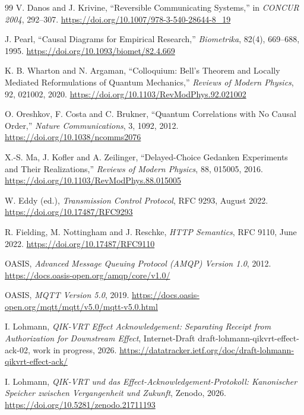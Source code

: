 \documentclass[11pt,a4paper]{article}
\theoremstyle{remark}
\begin{document}
\begin{thebibliography}{99}
V. Danos and J. Krivine,
``Reversible Communicating Systems,'' in \emph{CONCUR 2004}, 292--307.
\url{https://doi.org/10.1007/978-3-540-28644-8_19}

J. Pearl,
``Causal Diagrams for Empirical Research,''
\emph{Biometrika}, 82(4), 669--688, 1995.
\url{https://doi.org/10.1093/biomet/82.4.669}

K. B. Wharton and N. Argaman,
``Colloquium: Bell's Theorem and Locally Mediated Reformulations of Quantum
Mechanics,'' \emph{Reviews of Modern Physics}, 92, 021002, 2020.
\url{https://doi.org/10.1103/RevModPhys.92.021002}

O. Oreshkov, F. Costa and C. Brukner,
``Quantum Correlations with No Causal Order,''
\emph{Nature Communications}, 3, 1092, 2012.
\url{https://doi.org/10.1038/ncomms2076}

X.-S. Ma, J. Kofler and A. Zeilinger,
``Delayed-Choice Gedanken Experiments and Their Realizations,''
\emph{Reviews of Modern Physics}, 88, 015005, 2016.
\url{https://doi.org/10.1103/RevModPhys.88.015005}

W. Eddy (ed.),
\emph{Transmission Control Protocol}, RFC 9293, August 2022.
\url{https://doi.org/10.17487/RFC9293}

R. Fielding, M. Nottingham and J. Reschke,
\emph{HTTP Semantics}, RFC 9110, June 2022.
\url{https://doi.org/10.17487/RFC9110}

OASIS,
\emph{Advanced Message Queuing Protocol (AMQP) Version 1.0}, 2012.
\url{https://docs.oasis-open.org/amqp/core/v1.0/}

OASIS,
\emph{MQTT Version 5.0}, 2019.
\url{https://docs.oasis-open.org/mqtt/mqtt/v5.0/mqtt-v5.0.html}

I. Lohmann,
\emph{QIK-VRT Effect Acknowledgement: Separating Receipt from Authorization
for Downstream Effect},
Internet-Draft draft-lohmann-qikvrt-effect-ack-02, work in progress, 2026.
\url{https://datatracker.ietf.org/doc/draft-lohmann-qikvrt-effect-ack/}

I. Lohmann,
\emph{QIK-VRT und das Effect-Acknowledgement-Protokoll: Kanonischer Speicher
zwischen Vergangenheit und Zukunft}, Zenodo, 2026.
\url{https://doi.org/10.5281/zenodo.21711193}

\end{thebibliography}
\end{document}
